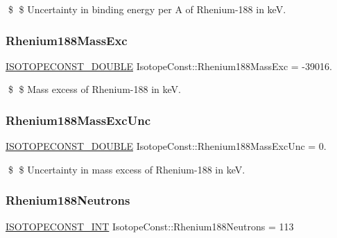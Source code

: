 \$ \$ Uncertainty in binding energy per A of Rhenium-\/188 in keV. \mbox{\label{group___isotope_const-_rhenium-_re188_ga50a58b6ca80ed97cad9ab625771ebccc}} 
\subsubsection{\texorpdfstring{Rhenium188\+Mass\+Exc}{Rhenium188MassExc}}
{\footnotesize\ttfamily \mbox{\hyperlink{group___isotope_const-_macros_ga8f45a7272ce02c0b4c65c44636ed719a}{I\+S\+O\+T\+O\+P\+E\+C\+O\+N\+S\+T\+\_\+\+D\+O\+U\+B\+LE}} Isotope\+Const\+::\+Rhenium188\+Mass\+Exc = -\/39016.}

\$ \$ Mass excess of Rhenium-\/188 in keV. \mbox{\label{group___isotope_const-_rhenium-_re188_ga455b2bd07aa22dfd66088220a70c8ee1}} 
\subsubsection{\texorpdfstring{Rhenium188\+Mass\+Exc\+Unc}{Rhenium188MassExcUnc}}
{\footnotesize\ttfamily \mbox{\hyperlink{group___isotope_const-_macros_ga8f45a7272ce02c0b4c65c44636ed719a}{I\+S\+O\+T\+O\+P\+E\+C\+O\+N\+S\+T\+\_\+\+D\+O\+U\+B\+LE}} Isotope\+Const\+::\+Rhenium188\+Mass\+Exc\+Unc = 0.}

\$ \$ Uncertainty in mass excess of Rhenium-\/188 in keV. \mbox{\label{group___isotope_const-_rhenium-_re188_ga2a0c305bf9dbae4d68fbd53ccd16de65}} 
\subsubsection{\texorpdfstring{Rhenium188\+Neutrons}{Rhenium188Neutrons}}
{\footnotesize\ttfamily \mbox{\hyperlink{group___isotope_const-_macros_ga5f18360b3e99483a35c32d789e62621c}{I\+S\+O\+T\+O\+P\+E\+C\+O\+N\+S\+T\+\_\+\+I\+NT}} Isotope\+Const\+::\+Rhenium188\+Neutrons = 113}

